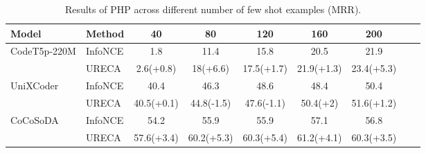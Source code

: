 \begin{table*}[h]
\def\arraystretch{1.0}
\setlength\tabcolsep{8pt} %
\begin{tabular}{@{}lllcccccc@{}}

\toprule
Model                            & \multicolumn{1}{l}{Method}              & \multicolumn{1}{c}{40}           
& \multicolumn{1}{c}{80}         & \multicolumn{1}{c}{120}               & \multicolumn{1}{c}{160}     
& \multicolumn{1}{c}{200}        \\ \midrule

\multirow{2}{*}{CodeT5p-220M}      
& InfoNCE                   & \multicolumn{1}{c}{1.8}          & \multicolumn{1}{c}{11.4}          
                            & \multicolumn{1}{c}{15.8}          & \multicolumn{1}{c}{20.5}          
                            & \multicolumn{1}{c}{21.9}                  
                            \\ \cmidrule(l){2-7} 
& URECA                     & \multicolumn{1}{c}{2.6(+0.8)}          & \multicolumn{1}{c}{18(+6.6)}          
                            & \multicolumn{1}{c}{17.5(+1.7)}          & \multicolumn{1}{c}{21.9(+1.3)}          
                            & \multicolumn{1}{c}{23.4(+5.3)}                   
                            \\ \midrule

\multirow{2}{*}{UniXCoder} 
& InfoNCE                   & \multicolumn{1}{c}{40.4}          & \multicolumn{1}{c}{46.3}          
                            & \multicolumn{1}{c}{48.6}          & \multicolumn{1}{c}{48.4}          
                            & \multicolumn{1}{c}{50.4}                   
                            \\ \cmidrule(l){2-7} 
& URECA                     & \multicolumn{1}{c}{40.5(+0.1)}          & \multicolumn{1}{c}{44.8(-1.5)}          
                            & \multicolumn{1}{c}{47.6(-1.1)}          & \multicolumn{1}{c}{50.4(+2)}          
                            & \multicolumn{1}{c}{51.6(+1.2)}                  
                            \\ \midrule

\multirow{2}{*}{CoCoSoDA} 
& InfoNCE                   & \multicolumn{1}{c}{54.2}          & \multicolumn{1}{c}{55.9}          
                            & \multicolumn{1}{c}{55.9}          & \multicolumn{1}{c}{57.1}          
                            & \multicolumn{1}{c}{56.8}                    
                            \\ \cmidrule(l){2-7} 
& URECA                     & \multicolumn{1}{c}{57.6(+3.4)}          & \multicolumn{1}{c}{60.2(+5.3)}          
                            & \multicolumn{1}{c}{60.3(+5.4)}          & \multicolumn{1}{c}{61.2(+4.1)}          
                            & \multicolumn{1}{c}{60.3(+3.5)}                   
                            \\ \bottomrule 
\end{tabular}
\caption{Results of PHP across different number of few shot examples (MRR).}
\label{CSN_PHP}
\end{table*}

